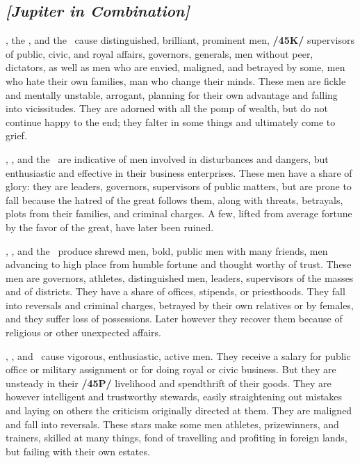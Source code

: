 \secbr
{}
\subsection{\textit{[Jupiter in Combination]}}
\Jupiter, the \Sun, and the \Moon\, cause distinguished, brilliant, prominent men, \textbf{/45K/} supervisors of
public, civic, and royal affairs, governors, generals, men without peer, dictators, as well as men who are envied, maligned, and betrayed by some, men who hate their own families, man who change their minds. These men are fickle and mentally unstable, arrogant, planning for their own advantage and falling into vicissitudes. They are adorned with all the pomp of wealth, but do not continue happy to the end; they
falter in some things and ultimately come to grief.

\Jupiter, \Mars, and the \Sun\, are indicative of men involved in disturbances and dangers, but enthusiastic
and effective in their business enterprises. These men have a share of glory: they are leaders, governors, supervisors of public matters, but are prone to fall because the hatred of the great follows them, along with threats, betrayals, plots from their families, and criminal charges. A few, lifted from average fortune by the favor of the great, have later been ruined.

\Jupiter, \Mars, and the \Moon\, produce shrewd men, bold, public men with many friends, men advancing to high place from humble fortune and thought worthy of trust. These men are governors, athletes, distinguished men, leaders, supervisors of the masses and of districts. They have a share of offices, stipends, or priesthoods. They fall into reversals and criminal charges, betrayed by their own relatives or by females, and they suffer loss of possessions. Later however they recover them because of religious or other unexpected affairs.

\Jupiter, \Mars, and \Mercury\, cause vigorous, enthusiastic, active men. They receive a salary for public
office or military assignment or for doing royal or civic business. But they are unsteady in their \textbf{/45P/}
livelihood and spendthrift of their goods. They are however intelligent and trustworthy stewards, easily straightening out mistakes and laying on others the criticism originally directed at them. They are maligned and fall into reversals. These stars make some men athletes, prizewinners, and trainers, skilled at many things, fond of travelling and profiting in foreign lands, but failing with their own estates. 


